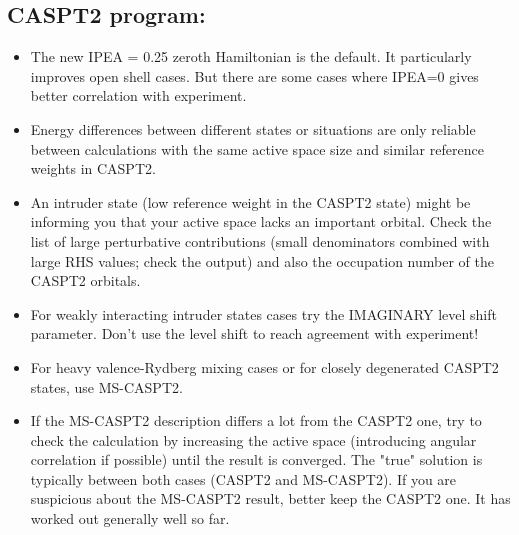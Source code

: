 
\subsection{CASPT2 program:}
\begin{itemize}
\item The new IPEA = 0.25 zeroth Hamiltonian is the default. 
It particularly improves open shell cases. But there are some cases where
IPEA=0 gives better correlation with experiment.
\item Energy differences between different states or situations are only reliable between 
calculations with the same active space size and similar reference weights in CASPT2. 
\item An intruder state (low reference weight in the CASPT2 state) might be informing you 
that your active space lacks an important orbital. Check the list of large perturbative 
contributions (small denominators combined with large RHS values; check the output) 
and also the occupation number of the CASPT2 orbitals. 
\item For weakly interacting intruder states cases try the IMAGINARY level shift parameter. 
Don't use the level shift to reach agreement with experiment! 
\end{itemize}


\begin{itemize}
\item For heavy valence-Rydberg mixing cases or for closely degenerated CASPT2 states, 
use MS-CASPT2. 
\item If the MS-CASPT2 description differs a lot from the CASPT2 one, 
try to check the 
calculation by increasing the active space (introducing angular correlation if possible) 
until the result is converged. The "true" solution is typically between both cases 
(CASPT2 and MS-CASPT2). If you are suspicious about the MS-CASPT2 result, 
better keep the CASPT2 one. It has worked out generally well so far. 
\end{itemize}

